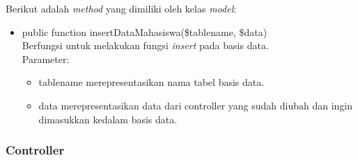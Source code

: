 	Berikut adalah \textit{method} yang dimiliki oleh kelas \textit{model}:
	\begin{itemize}
		\item public function insertDataMahasiswa(\$tablename, \$data)\\
		Berfungsi untuk melakukan fungsi \textit{insert} pada basis data.\\
		Parameter: 
		\begin{itemize}
			\item tablename merepresentasikan nama tabel basis data.
			\item data merepresentasikan data dari controller yang sudah diubah dan ingin dimasukkan kedalam basis data.
		\end{itemize}
	\end{itemize}
	
	\subsubsection{Controller}
	\label{subsub: controllerCI}
	
